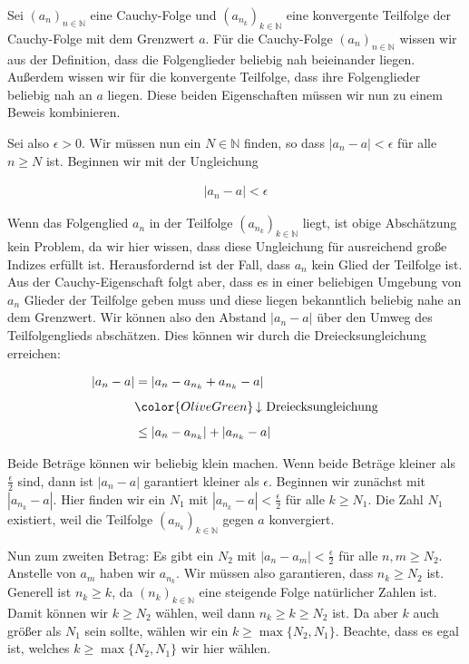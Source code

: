 \documentclass[fontsize=9pt,
               parskip=half-,
               DIV=14,
               listof=chapterentry,
               tocflat]{scrbook}
\begin{document}
\begin{solutionprocess*}
Sei $(a_{n})_{n\in \mathbb {N} }$ eine Cauchy-Folge und $\left(a_{n_{k}}\right)_{k\in \mathbb {N} }$ eine konvergente Teilfolge der Cauchy-Folge mit dem Grenzwert $a$. Für die Cauchy-Folge $(a_{n})_{n\in \mathbb {N} }$ wissen wir aus der Definition, dass die Folgenglieder beliebig nah beieinander liegen. Außerdem wissen wir für die konvergente Teilfolge, dass ihre Folgenglieder beliebig nah an $a$ liegen. Diese beiden Eigenschaften müssen wir nun zu einem Beweis kombinieren.

Sei also $\epsilon >0$. Wir müssen nun ein $N\in \mathbb {N} $ finden, so dass $|a_{n}-a|<\epsilon $ für alle $n\geq N$ ist. Beginnen wir mit der Ungleichung

\begin{align*}
|a_{n}-a|<\epsilon 
\end{align*}

Wenn das Folgenglied $a_{n}$ in der Teilfolge $\left(a_{n_{k}}\right)_{k\in \mathbb {N} }$ liegt, ist obige Abschätzung kein Problem, da wir hier wissen, dass diese Ungleichung für ausreichend große Indizes erfüllt ist. Herausfordernd ist der Fall, dass $a_{n}$ kein Glied der Teilfolge ist. Aus der Cauchy-Eigenschaft folgt aber, dass es in einer beliebigen Umgebung von $a_{n}$ Glieder der Teilfolge geben muss und diese liegen bekanntlich beliebig nahe an dem Grenzwert. Wir können also den Abstand $|a_{n}-a|$ über den Umweg des Teilfolgenglieds abschätzen. Dies können wir durch die Dreiecksungleichung erreichen:

\begin{align*}
|a_{n}-a|&=\left|a_{n}-a_{n_{k}}+a_{n_{k}}-a\right|\\[0.5em]&{\color {OliveGreen}\left\downarrow \ {\text{Dreiecksungleichung}}\right.}\\[0.5em]&\leq \left|a_{n}-a_{n_{k}}\right|+\left|a_{n_{k}}-a\right|
\end{align*}

Beide Beträge können wir beliebig klein machen. Wenn beide Beträge kleiner als ${\tfrac {\epsilon }{2}}$ sind, dann ist $|a_{n}-a|$ garantiert kleiner als $\epsilon $. Beginnen wir zunächst mit $\left|a_{n_{k}}-a\right|$. Hier finden wir ein $N_{1}$ mit $\left|a_{n_{k}}-a\right|<{\tfrac {\epsilon }{2}}$ für alle $k\geq N_{1}$. Die Zahl $N_{1}$ existiert, weil die Teilfolge $\left(a_{n_{k}}\right)_{k\in \mathbb {N} }$ gegen $a$ konvergiert.

Nun zum zweiten Betrag: Es gibt ein $N_{2}$ mit $|a_{n}-a_{m}|<{\tfrac {\epsilon }{2}}$ für alle $n,m\geq N_{2}$. Anstelle von $a_{m}$ haben wir $a_{n_{k}}$. Wir müssen also garantieren, dass $n_{k}\geq N_{2}$ ist. Generell ist $n_{k}\geq k$, da $(n_{k})_{k\in \mathbb {N} }$ eine steigende Folge natürlicher Zahlen ist. Damit können wir $k\geq N_{2}$ wählen, weil dann $n_{k}\geq k\geq N_{2}$ ist. Da aber $k$ auch größer als $N_{1}$ sein sollte, wählen wir ein $k\geq \max\{N_{2},N_{1}\}$. Beachte, dass es egal ist, welches $k\geq \max\{N_{2},N_{1}\}$ wir hier wählen.


\end{solutionprocess*}
\end{document}
